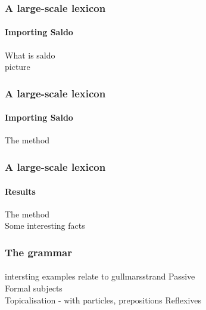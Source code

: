\documentclass[10pt]{beamer}
\renewcommand{\baselinestretch}{1.5}
\begin{document}
\begin{frame}
\frametitle{A large-scale lexicon}
\framesubtitle{Importing Saldo} 
What is saldo \\
picture\\
\end{frame}

\begin{frame}
\frametitle{A large-scale lexicon}
\framesubtitle{Importing Saldo} 
The method\\
\end{frame}

\begin{frame}
\frametitle{A large-scale lexicon}
\framesubtitle{Results} 
The method\\
Some interesting facts \\
\end{frame}

\begin{frame}
\frametitle{The grammar}
\framesubtitle{} 
intersting examples
relate to gullmarsstrand
Passive\\
Formal subjects\\
Topicalisation - with particles, prepositions
Reflexives
\end{frame}

\end{document}
